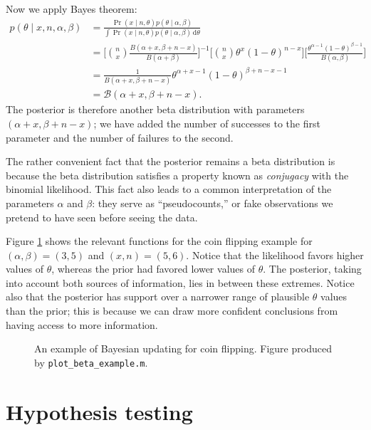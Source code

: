 \documentclass{article}
\newcommand{\given}{\mid}
\newcommand{\mc}[1]{\mathcal{#1}}
\newcommand{\intd}[1]{\,\mathrm{d}{#1}}
\newcommand{\inv}{^{-1}}
\begin{document}
Now we apply Bayes theorem:
\begin{align*}
  p(\theta \given x, n, \alpha, \beta)
  &=
  \frac
      {     \Pr(x \given n, \theta) p(\theta \given \alpha, \beta)}
      {\int \Pr(x \given n, \theta) p(\theta \given \alpha, \beta) \intd{\theta}}
  \\
  &=
  \biggl[
    \binom{n}{x}
    \frac{B(\alpha + x, \beta + n - x)}{B(\alpha + \beta)}
  \biggr]\inv
  \biggl[
    \binom{n}{x} \theta^x (1 - \theta)^{n - x}
  \biggr]
  \biggl[
    \frac{\theta^{\alpha - 1}(1 - \theta)^{\beta - 1}}{B(\alpha, \beta)}
  \biggr]
  \\
  &=
  \frac{1}{B(\alpha + x, \beta + n - x)}
  \theta^{\alpha + x - 1}(1 - \theta)^{\beta + n - x - 1}
  \\
  &=
  \mc{B}(\alpha + x, \beta + n - x).
\end{align*}
The posterior is therefore another beta distribution with parameters
$(\alpha + x, \beta + n - x)$; we have added the number of successes
to the first parameter and the number of failures to the second.

The rather convenient fact that the posterior remains a beta
distribution is because the beta distribution satisfies a property
known as \emph{conjugacy} with the binomial likelihood.  This fact
also leads to a common interpretation of the parameters $\alpha$ and
$\beta$: they serve as ``pseudocounts,'' or fake observations we
pretend to have seen before seeing the data.

Figure \ref{coin_flipping} shows the relevant functions for the coin
flipping example for $(\alpha, \beta) = (3, 5)$ and $(x, n) = (5, 6)$.
Notice that the likelihood favors higher values of $\theta$, whereas
the prior had favored lower values of $\theta$.  The posterior, taking
into account both sources of information, lies in between these
extremes.  Notice also that the posterior has support over a narrower
range of plausible $\theta$ values than the prior; this is because we
can draw more confident conclusions from having access to more
information.

\begin{figure}
  \centering
  
  \caption{An example of Bayesian updating for coin flipping.  Figure
    produced by \texttt{plot\_beta\_example.m}.}
  \label{coin_flipping}
\end{figure}

\section*{Hypothesis testing}
\end{document}
